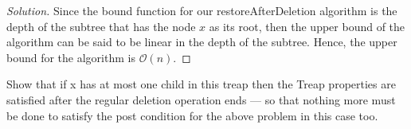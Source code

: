 \documentclass[12pt]{article}
\newenvironment{problem}[2][Problem]{\begin{trivlist}
\item[\hskip \labelsep {\bfseries #1}\hskip \labelsep {\bfseries #2.}]}{\end{trivlist}}
\newenvironment{solution}{\renewcommand\qedsymbol{$\blacksquare$}\begin{proof}[Solution]}{\end{proof}}
\begin{document}
\begin{solution}
    Since the bound function for our restoreAfterDeletion algorithm is the depth of the subtree that has the node $x$ as its root, then the upper bound of the algorithm can be said to be linear in the depth of the subtree. Hence, the upper bound for the algorithm is $\mathcal{O}(n)$.
\end{solution}


\begin{problem}{6}
    Show that if x has at most one child in this treap then the Treap properties are satisfied after the regular deletion operation ends — so that nothing more must be done to satisfy the post condition for the above problem in this case too.
\end{problem}
\end{document}
